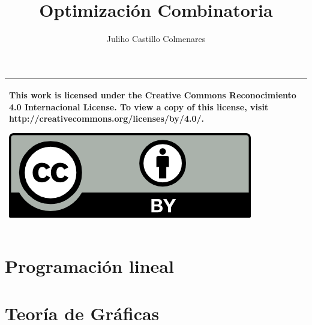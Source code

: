 \documentclass{tufte-book}
\title{Optimización Combinatoria}
\author{Juliho Castillo Colmenares}
\begin{document}
	\maketitle
	\begin{tabular}{|p{}|}
		\hline
		This work is licensed under the Creative Commons Reconocimiento 4.0 Internacional License. To view a copy of this license, visit
		http://creativecommons.org/licenses/by/4.0/.
		\begin{center}
			\includegraphics[scale=1]{./licencia/by.png}
		\end{center}\\
		\hline
	\end{tabular}
	\tableofcontents

\chapter{Programación lineal}


\chapter{Teoría de Gráficas}




	
\end{document}

